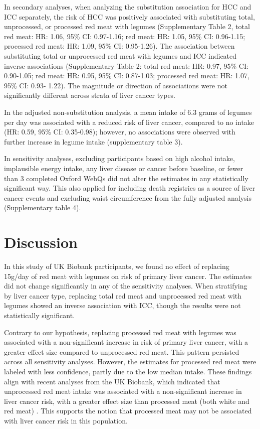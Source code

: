 \documentclass[sn-basic,Numbered,pdflatex]{sn-jnl}
\begin{document}
In secondary analyses, when analyzing the substitution association for
HCC and ICC separately, the risk of HCC was positively associated with
substituting total, unprocessed, or processed red meat with legumes
(Supplementary Table 2, total red meat:
HR: 1.06, 95\% CI: 0.97-1.16;
red meat:
HR: 1.05, 95\% CI: 0.96-1.15;
processed red meat:
HR: 1.09, 95\% CI: 0.95-1.26).
The association between substituting total or unprocessed red meat with
legumes and ICC indicated inverse associations (Supplementary Table 2:
total red meat:
HR: 0.97, 95\% CI: 0.90-1.05;
red meat:
HR: 0.95, 95\% CI: 0.87-1.03;
processed red meat:
HR: 1.07, 95\% CI: 0.93- 1.22).
The magnitude or direction of associations were not significantly
different across strata of liver cancer types.

In the adjusted non-substitution analysis, a mean intake of 6.3 grams of
legumes per day was associated with a reduced risk of liver cancer,
compared to no intake
(HR: 0.59, 95\% CI: 0.35-0.98);
however, no associations were observed with further increase in legume
intake (supplementary table 3).

In sensitivity analyses, excluding participants based on high alcohol
intake, implausible energy intake, any liver disease or cancer before
baseline, or fewer than 3 completed Oxford WebQs did not alter the
estimates in any statistically significant way. This also applied for
including death registries as a source of liver cancer events and
excluding waist circumference from the fully adjusted analysis
(Supplementary table 4).

\hypertarget{sec4}{%
\section{Discussion}\label{sec4}}

In this study of UK Biobank participants, we found no effect of
replacing 15g/day of red meat with legumes on risk of primary liver
cancer. The estimates did not change significantly in any of the
sensitivity analyses. When stratifying by liver cancer type, replacing
total red meat and unprocessed red meat with legumes showed an inverse
association with ICC, though the results were not statistically
significant.

Contrary to our hypothesis, replacing processed red meat with legumes
was associated with a non-significant increase in risk of primary liver
cancer, with a greater effect size compared to unprocessed red meat.
This pattern persisted across all sensitivity analyses. However, the
estimates for processed red meat were labeled with less confidence,
partly due to the low median intake. These findings align with recent
analyses from the UK Biobank, which indicated that unprocessed red meat
intake was associated with a non-significant increase in liver cancer
risk, with a greater effect size than processed meat (both white and red
meat) \citep{Knuppel2020}. This supports the notion that processed meat may
not be associated with liver cancer risk in this population.
\end{document}
